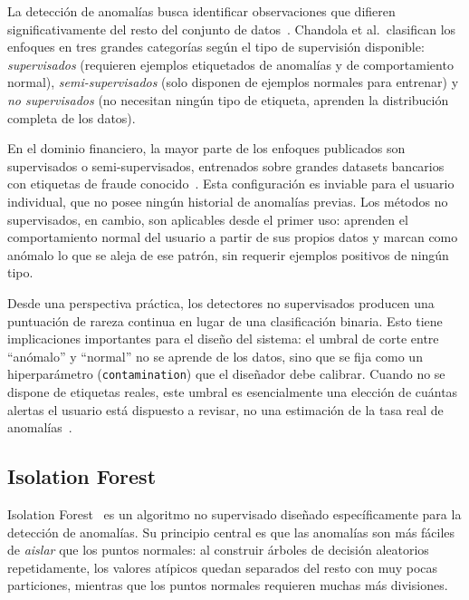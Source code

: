 \documentclass[conference]{IEEEtran}
\begin{document}
La detecci\'on de anomal\'ias busca identificar observaciones que difieren
significativamente del resto del conjunto de datos~\cite{chandola2009anomaly}.
Chandola et al.\ clasifican los enfoques en tres grandes categor\'ias seg\'un el
tipo de supervisi\'on disponible: \emph{supervisados} (requieren ejemplos etiquetados
de anomal\'ias y de comportamiento normal), \emph{semi-supervisados} (solo disponen de
ejemplos normales para entrenar) y \emph{no supervisados} (no necesitan ning\'un tipo
de etiqueta, aprenden la distribuci\'on completa de los datos).

En el dominio financiero, la mayor parte de los enfoques publicados son supervisados o
semi-supervisados, entrenados sobre grandes datasets bancarios con etiquetas de fraude
conocido~\cite{ahmed2016survey, dalpozzolo2018credit}. Esta configuraci\'on es
inviable para el usuario individual, que no posee ning\'un historial de anomal\'ias
previas. Los m\'etodos no supervisados, en cambio, son aplicables desde el primer
uso: aprenden el comportamiento normal del usuario a partir de sus propios datos y
marcan como an\'omalo lo que se aleja de ese patr\'on, sin requerir ejemplos positivos
de ning\'un tipo.

Desde una perspectiva pr\'actica, los detectores no supervisados producen una
puntuaci\'on de rareza continua en lugar de una clasificaci\'on binaria. Esto tiene
implicaciones importantes para el dise\~no del sistema: el umbral de corte entre
``an\'omalo'' y ``normal'' no se aprende de los datos, sino que se fija como un
hiperpar\'ametro (\texttt{contamination}) que el dise\~nador debe calibrar. Cuando no
se dispone de etiquetas reales, este umbral es esencialmente una elecci\'on de cu\'antas
alertas el usuario est\'a dispuesto a revisar, no una estimaci\'on de la tasa real
de anomal\'ias~\cite{dalpozzolo2018credit}.

\subsection{Isolation Forest}

Isolation Forest~\cite{liu2008isolation, liu2012isolation} es un algoritmo no
supervisado dise\~nado espec\'ificamente para la detecci\'on de anomal\'ias.
Su principio central es que las anomal\'ias son m\'as f\'aciles de \emph{aislar}
que los puntos normales: al construir \'arboles de decisi\'on aleatorios
repetidamente, los valores at\'ipicos quedan separados del resto con muy pocas
particiones, mientras que los puntos normales requieren muchas m\'as divisiones.
\end{document}
